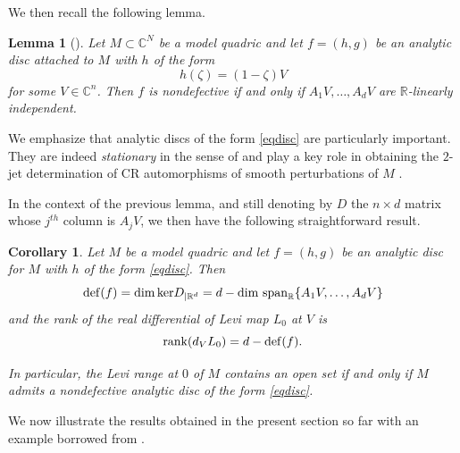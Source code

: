 \documentclass[12pt]{amsart}
\newcommand{\C}{\mathbb C}
\newcommand{\R}{\mathbb R}
\newtheorem{lemma}[theo]{Lemma}
\newtheorem{cor}[theo]{Corollary}
\theoremstyle{remark}
\theoremstyle{example}
\theoremstyle{definition}
\numberwithin{equation}{section}
\begin{document}
We then recall the following  lemma.
\begin{lemma}[\cite{be-me}]\label{lemclio}
Let $M \subset \C^N$ be a model quadric and let $f=(h,g)$ be an analytic disc attached to $M$ with $h$ of the form 
\begin{equation}\label{eqdisc}
h(\zeta)=(1-\zeta)V
\end{equation}
 for some $V \in \C^n$. Then $f$ is nondefective if and only if $A_1V,\ldots,A_dV$ are $\R$-linearly independent.
\end{lemma} 
We emphasize that analytic discs of the form \eqref{eqdisc} are particularly important. They are indeed {\it stationary} in the sense of \cite{le,tu} and  
play a key role in obtaining the $2$-jet determination of CR automorphisms of  smooth perturbations of $M$ \cite{be-bl-me,be-me,tu3}.  

In the context of the previous lemma, and still denoting by $D$ the $n\times d$ matrix whose $j^{th}$ column is $A_jV$, we then have the following straightforward result. 
\begin{cor}\label{cordisc}
Let  $M$ be a   model  quadric  and let $f=(h,g)$ be an analytic disc for $M$ with $h$ of the form \eqref{eqdisc}. Then  
$${\rm def}(f)=\dim {\rm ker}D_{|\R^d}=d-{\rm dim} \ {\rm span}_\R\{A_1V,\ldots,A_dV\}$$
and the rank of the real differential of Levi map $L_0$ at $V$ is  
$${\rm rank}(d_VL_0)=d - {\rm def}(f).$$ 

In particular, the Levi range at $0$ of $M$ contains an open set if and only if $M$ admits a nondefective analytic disc of the form \eqref{eqdisc}.   
\end{cor}

We now illustrate the results obtained in the present section so far with an example borrowed from \cite{gr-me}. 
\end{document}
